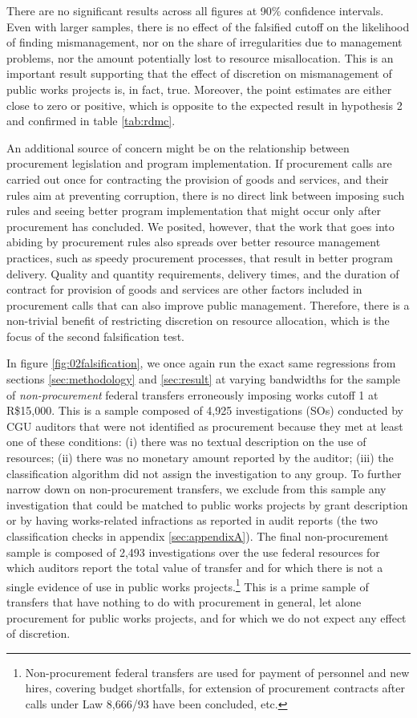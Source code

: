 \documentclass[11pt]{article}
\begin{document}
There are no significant results across all figures at 90\% confidence intervals. Even with larger samples, there is no effect of the falsified cutoff on the likelihood of finding mismanagement, nor on the share of irregularities due to management problems, nor the amount potentially lost to resource misallocation. This is an important result supporting that the effect of discretion on mismanagement of public works projects is, in fact, true. Moreover, the point estimates are either close to zero or positive, which is opposite to the expected result in hypothesis 2 and confirmed in table \ref{tab:rdmc}.

An additional source of concern might be on the relationship between procurement legislation and program implementation. If procurement calls are carried out once for contracting the provision of goods and services, and their rules aim at preventing corruption, there is no direct link between imposing such rules and seeing better program implementation that might occur only after procurement has concluded. We posited, however, that the work that goes into abiding by procurement rules also spreads over better resource management practices, such as speedy procurement processes, that result in better program delivery. Quality and quantity requirements, delivery times, and the duration of contract for provision of goods and services are other factors included in procurement calls that can also improve public management. Therefore, there is a non-trivial benefit of restricting discretion on resource allocation, which is the focus of the second falsification test.

In figure \ref{fig:02falsification}, we once again run the exact same regressions from sections \ref{sec:methodology} and \ref{sec:result} at varying bandwidths for the sample of \emph{non-procurement} federal transfers erroneously imposing works cutoff 1 at R\$15,000. This is a sample composed of 4,925 investigations (SOs) conducted by CGU auditors that were not identified as procurement because they met at least one of these conditions: (i) there was no textual description on the use of resources; (ii) there was no monetary amount reported by the auditor; (iii) the classification algorithm did not assign the investigation to any group. To further narrow down on non-procurement transfers, we exclude from this sample any investigation that could be matched to public works projects by grant description or by having works-related infractions as reported in audit reports (the two classification checks in appendix \ref{sec:appendixA}). The final non-procurement sample is composed of 2,493 investigations over the use federal resources for which auditors report the total value of transfer and for which there is not a single evidence of use in public works projects.\footnote{Non-procurement federal transfers are used for payment of personnel and new hires, covering budget shortfalls, for extension of procurement contracts after calls under Law 8,666/93 have been concluded, etc.} This is a prime sample of transfers that have nothing to do with procurement in general, let alone procurement for public works projects, and for which we do not expect any effect of discretion.
\end{document}
